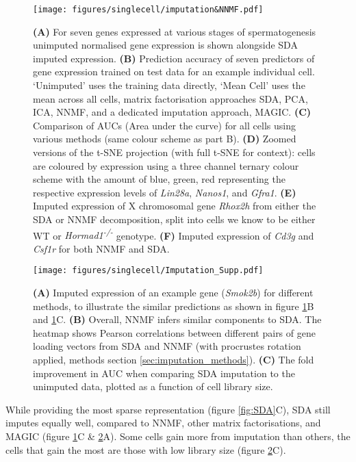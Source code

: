 \begin{figure}[H]
	\centering
	\texttt{[image: figures/singlecell/imputation\&NNMF.pdf]}
	\caption[SDA Imputation]{
		\textbf{(A)} For seven genes expressed at various stages of spermatogenesis unimputed normalised gene expression is shown alongside SDA imputed expression.
		\textbf{(B)} Prediction accuracy of seven predictors of gene expression trained on test data for an example individual cell.
			‘Unimputed’ uses the training data directly, ‘Mean Cell’ uses the mean across all cells, matrix factorisation approaches SDA, PCA, ICA, NNMF, and a dedicated imputation approach, MAGIC.
		\textbf{(C)} Comparison of AUCs (Area under the curve) for all cells using various methods (same colour scheme as part B).
		\textbf{(D)} Zoomed versions of the t-SNE projection (with full t-SNE for context): cells are coloured by expression using a three channel ternary colour scheme with the amount of blue, green, red representing the respective expression levels of \textit{Lin28a}, \textit{Nanos1}, and \textit{Gfra1}.
		\textbf{(E)} Imputed expression of X chromosomal gene \textit{Rhox2h} from either the SDA or NNMF decomposition, split into cells we know to be either WT or \textit{Hormad1\textsuperscript{-/-}} genotype.
		\textbf{(F)} Imputed expression of \textit{Cd3g} and \textit{Csf1r} for both NNMF and SDA.}
	\label{fig:imputation}
\end{figure}

\begin{figure}[H]
	\centering
	\texttt{[image: figures/singlecell/Imputation\_Supp.pdf]}
	\caption[Imputation Supplement]{
		\textbf{(A)} Imputed expression of an example gene (\textit{Smok2b}) for different methods, to illustrate the similar predictions as shown in figure \ref{fig:imputation}B and \ref{fig:imputation}C.
		\textbf{(B)} Overall, NNMF infers similar components to SDA.
			The heatmap shows Pearson correlations between different pairs of gene loading vectors from SDA and NNMF (with procrustes rotation applied, methods section \ref{sec:imputation_methods}).
		\textbf{(C)} The fold improvement in AUC when comparing SDA imputation to the unimputed data, plotted as a function of cell library size.
	}
	\label{fig:imputation_supp}
\end{figure}

While providing the most sparse representation (figure \ref{fig:SDA}C), SDA still imputes equally well, compared to NNMF, other matrix factorisations, and MAGIC \parencite{vanDijk2018Recovering} (figure \ref{fig:imputation}C \& \ref{fig:imputation_supp}A).
Some cells gain more from imputation than others, the cells that gain the most are those with low library size (figure \ref{fig:imputation_supp}C).

